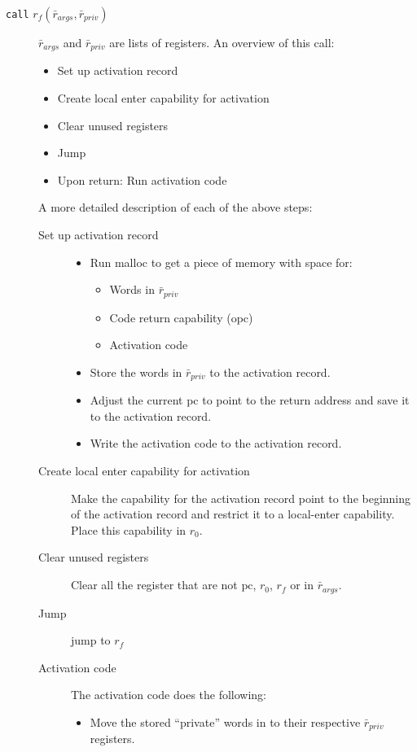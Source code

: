 \documentclass[a4paper]{article}
\newcommand{\var}[1]{\mathit{#1}}
\newcommand{\pcreg}{\mathrm{pc}}
\begin{document}
\begin{description}
\item[\texttt{call} $r_f(\bar{r}_{\var{args}},\bar{r}_{\var{priv}})$] $\bar{r}_{\var{args}}$ and $\bar{r}_{\var{priv}}$ are lists of registers. An overview of this call:
  \begin{itemize}
  \item Set up activation record
  \item Create local enter capability for activation
  \item Clear unused registers
  \item Jump
  \item Upon return: Run activation code
  \end{itemize}
A more detailed description of each of the above steps:
\begin{description}
  \item [Set up activation record]
    \begin{itemize}
    \item Run malloc to get a piece of memory with space for:
    \begin{itemize}
      \item Words in $\bar{r}_{\var{priv}}$
      \item Code return capability (opc)
      \item Activation code
    \end{itemize}
    \item Store the words in $\bar{r}_{\var{priv}}$ to the activation record. 
    \item Adjust the current pc to point to the return address and save it to the activation record.
    \item Write the activation code to the activation record.
  \end{itemize}
  \item [Create local enter capability for activation] Make the capability for the activation record point to the beginning of the activation record and restrict it to a local-enter capability. Place this capability in $r_0$.
  \item [Clear unused registers]
    Clear all the register that are not $\pcreg$, $r_0$, $r_f$ or in $\bar{r}_{\var{args}}$.
  \item [Jump] jump to $r_f$
  \item [Activation code] The activation code does the following:
    \begin{itemize}
    \item Move the stored ``private'' words in to their respective $\bar{r}_{\var{priv}}$ registers.

\end{itemize}
\end{description}
\end{description}
\end{document}
